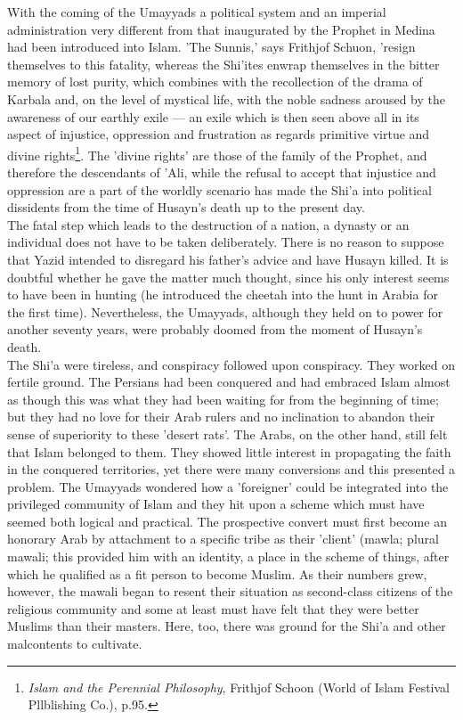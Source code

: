 \documentclass[11pt, b5paper, twoside]{book}
\begin{document}
With the coming of the Umayyads a political system and an imperial administration very different from 
that inaugurated by the Prophet in Medina had been introduced into Islam. 'The Sunnis,' says Frithjof 
Schuon, 'resign themselves to this fatality, whereas the Shi'ites enwrap themselves in the bitter 
memory of lost purity, which combines with the recollection of the drama of Karbala and, on the level 
of mystical life, with the noble sadness aroused by the awareness of our earthly exile --- an exile 
which is then seen above all in its aspect of injustice, oppression and frustration as regards 
primitive virtue and divine rights\footnote{\emph{Islam and the Perennial Philosophy}, Frithjof Schoon (World of Islam Festival Pllblishing Co.), p.95.}. The 'divine rights' are those of the family of the Prophet, 
and therefore the descendants of 'Ali, while the refusal to accept that injustice and oppression are 
a part of the worldly scenario has made the Shi'a into political dissidents from the time of Husayn's 
death up to the present day. \\

The fatal step which leads to the destruction of a nation, a dynasty or an individual does not have 
to be taken deliberately. There is no reason to suppose that Yazid intended to disregard his father's 
advice and have Husayn killed. It is doubtful whether he gave the matter much thought, since his only 
interest seems to have been in hunting (he introduced the cheetah into the hunt in Arabia for the 
first time). Nevertheless, the Umayyads, although they held on to power for another seventy years, 
were probably doomed from the moment of Husayn's death. \\

The Shi'a were tireless, and conspiracy followed upon conspiracy. They worked on fertile ground. The 
Persians had been conquered and had embraced Islam almost as though this was what they had been 
waiting for from the beginning of time; but they had no love for their Arab rulers and no inclination 
to abandon their sense of superiority to these 'desert rats'. The Arabs, on the other hand, still 
felt that Islam belonged to them. They showed little interest in propagating the faith in the 
conquered territories, yet there were many conversions and this presented a problem. The Umayyads 
wondered how a 'foreigner' could be integrated into the privileged community of Islam and they hit 
upon a scheme which must have seemed both logical and practical. The prospective convert must first 
become an honorary Arab by attachment to a specific tribe as their 'client' (mawla; plural mawali; 
this provided him with an identity, a place in the scheme of things, after which he qualified as a 
fit person to become Muslim. As their numbers grew, however, the mawali began to resent their 
situation as second-class citizens of the religious community and some at least must have felt that 
they were better Muslims than their masters. Here, too, there was ground for the Shi'a and other 
malcontents to cultivate. \\
\end{document}
